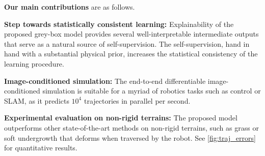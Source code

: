 
\textbf{Our main contributions} are as follows.

\textbf{Step towards statistically consistent learning:} Explainability of the proposed grey-box model provides several
well-interpretable intermediate outputs that serve as a natural source of self-supervision.
The self-supervision, hand in hand with a substantial physical prior,
increases the statistical consistency of the learning procedure.

\textbf{Image-conditioned simulation:} The end-to-end differentiable image-conditioned simulation is suitable
for a myriad of robotics tasks such as control or SLAM, as it predicts $10^4$ trajectories in parallel per second.

\textbf{Experimental evaluation on non-rigid terrains:} The proposed model outperforms other state-of-the-art methods
on non-rigid terrains, such as grass or soft undergrowth that deforms when traversed by the robot. See \autoref{fig:traj_errors} for quantitative results.

